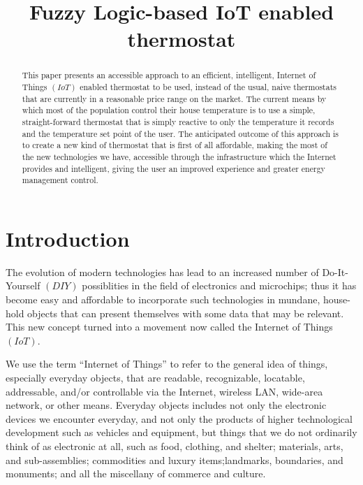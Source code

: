 \documentclass[conference]{IEEEtran}
\let\Oldsection\section
\renewcommand{\section}{\FloatBarrier\Oldsection}
\begin{document}
\title{Fuzzy Logic-based IoT enabled thermostat}


\author{
}

\maketitle


\begin{abstract}

This paper presents an accessible approach to an efficient, intelligent, Internet of Things $(IoT)$ enabled
thermostat to be used, instead of the usual, naive thermostats that are currently in a reasonable price range
on the market. The current means by which most of the population control their house temperature is to use a
simple, straight-forward thermostat that is simply reactive to only the temperature it records and the
temperature set point of the user. The anticipated outcome of this approach is to create a new kind of
thermostat that is first of all affordable, making the most of the new technologies we have, accessible through
the infrastructure which the Internet provides and intelligent, giving the user an improved experience and
greater energy management control.

\end{abstract}


\section{Introduction}
\label{Introduction}

The evolution of modern technologies has lead to an increased number of Do-It-Yourself $(DIY)$ possiblities in
the field of electronics and microchips; thus it has become easy and affordable to incorporate such
technologies in mundane, house-hold objects that can present themselves with some data that may be relevant.
This new concept turned into a movement now called the Internet of Things $(IoT)$.

We use the term “Internet of Things” to refer to the general idea of things, especially everyday objects, that
are readable, recognizable, locatable, addressable, and/or controllable via the Internet,
wireless LAN, wide-area network, or other means. Everyday objects includes not only the electronic devices we
encounter everyday, and not only the products of higher technological development such as vehicles and
equipment, but things that we do not ordinarily think of as electronic at all, such as food, clothing, and
shelter; materials, arts, and sub-assemblies; commodities and luxury items;landmarks, boundaries,
and monuments; and all the miscellany of commerce and culture. \cite{DisruptiveCivilTechnologies}
\end{document}
